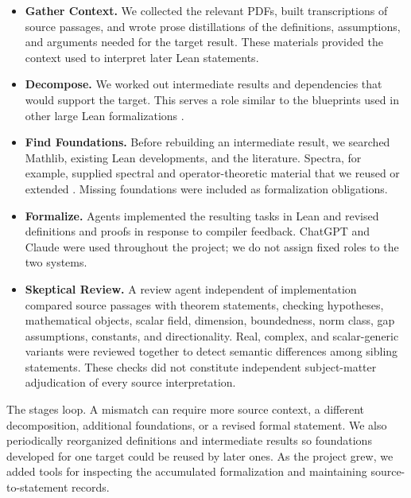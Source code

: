 \documentclass{article}
\begin{document}
\begin{itemize}
\setlength{\itemsep}{0.25em}
\item \textbf{Gather Context.}  We collected the relevant PDFs, built
  transcriptions of source passages, and wrote prose distillations of the
  definitions, assumptions, and arguments needed for the target result.  These
  materials provided the context used to interpret later Lean statements.

\item \textbf{Decompose.}  We worked out intermediate results and dependencies
  that would support the target.  This serves a role similar to the blueprints
  used in other large Lean formalizations
  \citep{liquidblueprint2023,pfrblueprint2024,zhu2026leanarchitect}.

\item \textbf{Find Foundations.}  Before rebuilding an intermediate result, we
  searched Mathlib, existing Lean developments, and the literature.  Spectra,
  for example, supplied spectral and operator-theoretic material that we reused
  or extended \citep{bornemann2026spectra}. 
  Missing foundations were included as formalization obligations.

\item \textbf{Formalize.}  Agents implemented the resulting tasks in Lean and
  revised definitions and proofs in response to compiler feedback.  ChatGPT and
  Claude were used throughout the project; we do not assign fixed roles to the
  two systems.

\item \textbf{Skeptical Review.}  A review agent independent of implementation
  compared source passages with theorem statements, checking hypotheses,
  mathematical objects, scalar field, dimension, boundedness, norm class, gap
  assumptions, constants, and directionality.  Real, complex, and scalar-generic variants were reviewed 
  together to detect semantic differences among sibling statements.  These
  checks did not constitute independent subject-matter adjudication of every
  source interpretation.
\end{itemize}

The stages loop.  A mismatch can require more source context, a different
decomposition, additional foundations, or a revised formal statement.  We also
periodically reorganized definitions and intermediate results so foundations
developed for one target could be reused by later ones.  As the project grew,
we added tools for inspecting the accumulated formalization and maintaining
source-to-statement records.
\end{document}
